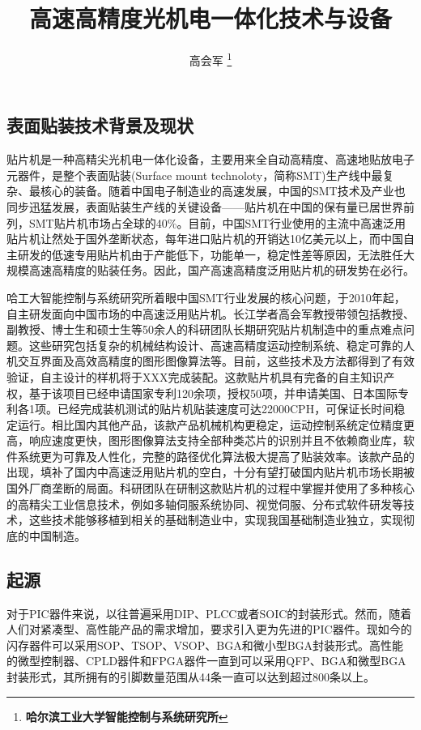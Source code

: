 \documentclass[a4paper]{article}%
\begin{document}
\begin{CJK}{UTF8}{gbsn}
\title{高速高精度光机电一体化技术与设备}
\author{高会军
\thanks{\textbf{哈尔滨工业大学智能控制与系统研究所}}
\date{\CurrentDate} %
}
\maketitle
\clearpage
\tableofcontents
\clearpage

\section{表面贴装技术背景及现状}

贴片机是一种高精尖光机电一体化设备，主要用来全自动高精度、高速地贴放电子元器件，是整个表面贴装(Surface mount technoloty，简称SMT)生产线中最复杂、最核心的装备。随着中国电子制造业的高速发展，中国的SMT技术及产业也同步迅猛发展，表面贴装生产线的关键设备——贴片机在中国的保有量已居世界前列，SMT贴片机市场占全球的40\%。目前，中国SMT行业使用的主流中高速泛用贴片机让然处于国外垄断状态，每年进口贴片机的开销达10亿美元以上，而中国自主研发的低速专用贴片机由于产能低下，功能单一，稳定性差等原因，无法胜任大规模高速高精度的贴装任务。因此，国产高速高精度泛用贴片机的研发势在必行。

哈工大智能控制与系统研究所着眼中国SMT行业发展的核心问题，于2010年起，自主研发面向中国市场的中高速泛用贴片机。长江学者高会军教授带领包括教授、副教授、博士生和硕士生等50余人的科研团队长期研究贴片机制造中的重点难点问题。这些研究包括复杂的机械结构设计、高速高精度运动控制系统、稳定可靠的人机交互界面及高效高精度的图形图像算法等。目前，这些技术及方法都得到了有效验证，自主设计的样机将于XXX完成装配。这款贴片机具有完备的自主知识产权，基于该项目已经申请国家专利120余项，授权50项，并申请美国、日本国际专利各1项。已经完成装机测试的贴片机贴装速度可达22000CPH，可保证长时间稳定运行。相比国内其他产品，该款产品机械机构更稳定，运动控制系统定位精度更高，响应速度更快，图形图像算法支持全部种类芯片的识别并且不依赖商业库，软件系统更为可靠及人性化，完整的路径优化算法极大提高了贴装效率。该款产品的出现，填补了国内中高速泛用贴片机的空白，十分有望打破国内贴片机市场长期被国外厂商垄断的局面。科研团队在研制这款贴片机的过程中掌握并使用了多种核心的高精尖工业信息技术，例如多轴伺服系统协同、视觉伺服、分布式软件研发等技术，这些技术能够移植到相关的基础制造业中，实现我国基础制造业独立，实现彻底的中国制造。
\subsection{起源}
对于PIC器件来说，以往普遍采用DIP、PLCC或者SOIC的封装形式。然而，随着人们对紧凑型、高性能产品的需求增加，要求引入更为先进的PIC器件。现如今的闪存器件可以采用SOP、TSOP、VSOP、BGA和微小型BGA封装形式。高性能的微型控制器、CPLD器件和FPGA器件一直到可以采用QFP、BGA和微型BGA封装形式，其所拥有的引脚数量范围从44条一直可以达到超过800条以上。


\end{CJK}
\end{document}

